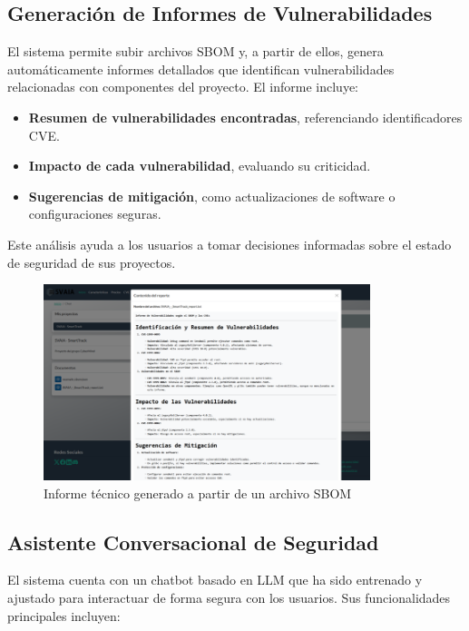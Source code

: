 \documentclass[11pt]{article}
\begin{document}
\subsection{Generación de Informes de Vulnerabilidades}

El sistema permite subir archivos SBOM y, a partir de ellos, genera automáticamente informes detallados que identifican vulnerabilidades relacionadas con componentes del proyecto. El informe incluye:

\begin{itemize}
    \item \textbf{Resumen de vulnerabilidades encontradas}, referenciando identificadores CVE.
    \item \textbf{Impacto de cada vulnerabilidad}, evaluando su criticidad.
    \item \textbf{Sugerencias de mitigación}, como actualizaciones de software o configuraciones seguras.
\end{itemize}

Este análisis ayuda a los usuarios a tomar decisiones informadas sobre el estado de seguridad de sus proyectos.

\begin{figure}[H]
    \centering
    \includegraphics[width=0.85\textwidth]{images/svaia_cve_report.png}
    \caption{Informe técnico generado a partir de un archivo SBOM}
\end{figure}

\subsection{Asistente Conversacional de Seguridad}

El sistema cuenta con un chatbot basado en LLM que ha sido entrenado y ajustado para interactuar de forma segura con los usuarios. Sus funcionalidades principales incluyen:
\end{document}
